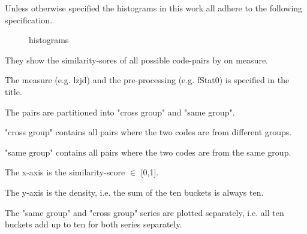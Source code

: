 \documentclass[../main.tex]{subfiles}
\begin{document}
Unless otherwise specified the histograms  in this work all adhere to the following specification.

\begin{figure}[ht!]
  \centering

  \caption{histograms}
  \label{fig:histograms}
\end{figure}

\begin{ul}
  \item They show the similarity-sores of all possible code-pairs by on measure.
  \item The measure (e.g. lzjd) and the pre-processing (e.g. fStat0) is specified in the title.
  \item The pairs are partitioned into "cross group" and "same group".
  \item "cross group" contains all pairs where the two codes are from different groups.
  \item "same group" contains all pairs where the two codes are from the same group.
  \item The x-axis is the similarity-score $\in$ [0,1].
  \item The y-axis is the density, i.e. the sum of the ten buckets is always ten.
  \item The "same group" and "cross group" series are plotted separately, i.e. all ten buckets add up to ten for both series separately.
\end{ul}
\end{document}
